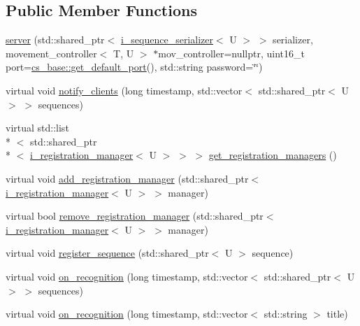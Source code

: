 \subsection*{Public Member Functions}
\begin{DoxyCompactItemize}
\item 
\hyperlink{classmae_1_1eventing_1_1server_a89b0bb290292f4acc84148b7018e172f}{server} (std\-::shared\-\_\-ptr$<$ \hyperlink{classmae_1_1eventing_1_1i__sequence__serializer}{i\-\_\-sequence\-\_\-serializer}$<$ U $>$ $>$ serializer, movement\-\_\-controller$<$ T, U $>$ $\ast$mov\-\_\-controller=nullptr, uint16\-\_\-t port=\hyperlink{classmae_1_1eventing_1_1cs__base_a5c068f50b548ec7299133976c00fa5a4}{cs\-\_\-base\-::get\-\_\-default\-\_\-port}(), std\-::string password=\char`\"{}\char`\"{})
\item 
virtual void \hyperlink{classmae_1_1eventing_1_1server_a94954a9ac22bbd73c36886815822fb8c}{notify\-\_\-clients} (long timestamp, std\-::vector$<$ std\-::shared\-\_\-ptr$<$ U $>$ $>$ sequences)
\item 
virtual std\-::list\\*
$<$ std\-::shared\-\_\-ptr\\*
$<$ \hyperlink{classmae_1_1eventing_1_1i__registration__manager}{i\-\_\-registration\-\_\-manager}$<$ U $>$ $>$ $>$ \hyperlink{classmae_1_1eventing_1_1server_acc7baf90eabaf3b7da1892d1ae95217e}{get\-\_\-registration\-\_\-managers} ()
\item 
virtual void \hyperlink{classmae_1_1eventing_1_1server_a7605c3953ad60a1ead4bc74c3085dcb5}{add\-\_\-registration\-\_\-manager} (std\-::shared\-\_\-ptr$<$ \hyperlink{classmae_1_1eventing_1_1i__registration__manager}{i\-\_\-registration\-\_\-manager}$<$ U $>$ $>$ manager)
\item 
virtual bool \hyperlink{classmae_1_1eventing_1_1server_a95e6e7b3e36fe6aaba85bbd5f4ca923f}{remove\-\_\-registration\-\_\-manager} (std\-::shared\-\_\-ptr$<$ \hyperlink{classmae_1_1eventing_1_1i__registration__manager}{i\-\_\-registration\-\_\-manager}$<$ U $>$ $>$ manager)
\item 
virtual void \hyperlink{classmae_1_1eventing_1_1server_ad2d13686ace9b9edac090834f82ef1b4}{register\-\_\-sequence} (std\-::shared\-\_\-ptr$<$ U $>$ sequence)
\item 
virtual void \hyperlink{classmae_1_1eventing_1_1server_adb20e7fbaa2413ea1897f2d0687c4e16}{on\-\_\-recognition} (long timestamp, std\-::vector$<$ std\-::shared\-\_\-ptr$<$ U $>$ $>$ sequences)
\item 
virtual void \hyperlink{classmae_1_1eventing_1_1server_a52c97fd5f391c6b26625201eb5d58c48}{on\-\_\-recognition} (long timestamp, std\-::vector$<$ std\-::string $>$ title)
\end{DoxyCompactItemize}

